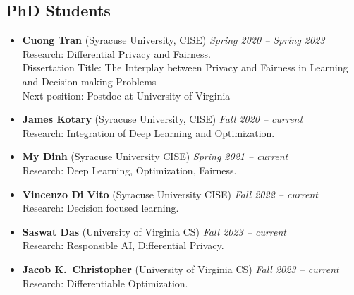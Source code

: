 
\subsection*{PhD Students}
\begin{itemize}
    \item \textbf{Cuong Tran} ({\sc Syracuse University}, CISE) 
  \hfill{\em Spring 2020 -- Spring 2023}\\
  {\sc Research}: Differential Privacy and Fairness.\\
  {\sc Dissertation Title:} The Interplay between Privacy and Fairness in
  Learning and Decision-making Problems\\
  {\sc Next position:} Postdoc at University of Virginia 
  
  \item \textbf{James Kotary} ({\sc Syracuse University}, CISE) 
  \hfill{\em Fall 2020 -- current}\\
  {\sc Research}: Integration of Deep Learning and Optimization.
  
  \item \textbf{My Dinh} ({\sc Syracuse University} CISE) 
  \hfill{\em Spring 2021 -- current}\\
  {\sc Research}: Deep Learning, Optimization, Fairness.

  \item \textbf{Vincenzo Di Vito} ({\sc Syracuse University} CISE)
  \hfill{\em Fall 2022 -- current}\\
  {\sc Research:} Decision focused learning.

  \item \textbf{Saswat Das} ({\sc University of Virginia} CS)
  \hfill{\em Fall 2023 -- current}\\
  {\sc Research:} Responsible AI, Differential Privacy.

  \item \textbf{Jacob K.~Christopher} ({\sc University of Virginia} CS)
  \hfill{\em Fall 2023 -- current}\\
  {\sc Research:} Differentiable Optimization.

\end{itemize}
\medskip

